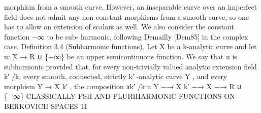 \documentclass[
  10pt,
]{article}
\newenvironment{Shaded}{}{}
\newcommand{\NormalTok}[1]{#1}
\begin{document}
\begin{Shaded}
\begin{Highlighting}[]
\NormalTok{morphism from a smooth curve. However, an inseparable curve over an imperfect field}
\NormalTok{does not admit any non{-}constant morphisms from a smooth curve, so one has to allow}
\NormalTok{an extension of scalars as well. We also consider the constant function −∞ to be sub{-}}
\NormalTok{harmonic, following Demailly [Dem85] in the complex case.}
\NormalTok{Definition 3.4 (Subharmonic functions). Let X be a k{-}analytic curve and let u: X →}
\NormalTok{R ∪ \{−∞\} be an upper semicontinuous function. We say that u is subharmonic provided}
\NormalTok{that, for every non{-}trivially valued analytic extension field k′ /k, every smooth, connected,}
\NormalTok{strictly k′ {-}analytic curve Y , and every morphism Y → X k′ , the composition}
\NormalTok{                                        πk′ /k     u}
\NormalTok{                              Y −→ X k′ −→ X −→ R ∪ \{−∞\}}
\NormalTok{             CLASSICALLY PSH AND PLURIHARMONIC FUNCTIONS ON BERKOVICH SPACES              11}


\end{Highlighting}
\end{Shaded}
\end{document}
